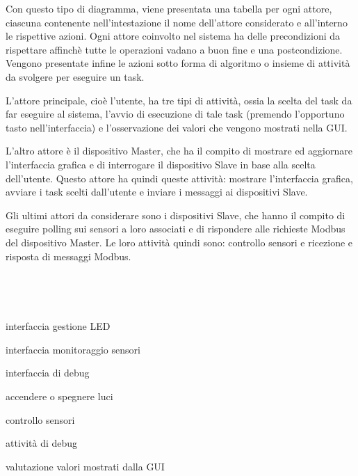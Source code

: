 \documentclass[a4paper,titlepage]{book}
\begin{document}
Con questo tipo di diagramma, viene presentata una tabella per ogni attore, ciascuna contenente nell'intestazione il nome dell'attore considerato e all'interno le rispettive azioni. Ogni attore coinvolto nel sistema ha delle precondizioni da rispettare affinchè tutte le operazioni vadano a buon fine e una postcondizione. Vengono presentate infine le azioni sotto forma di algoritmo o insieme di attività da svolgere per eseguire un task.

L'attore principale, cioè l'utente, ha tre tipi di attività, ossia la scelta del task da far eseguire al sistema, l'avvio di esecuzione di tale task (premendo l'opportuno tasto nell'interfaccia) e l'osservazione dei valori che vengono mostrati nella GUI.

L'altro attore è il dispositivo Master, che ha il compito di mostrare ed aggiornare l'interfaccia grafica e di interrogare il dispositivo Slave in base alla scelta dell'utente. Questo attore ha quindi queste attività: mostrare l'interfaccia grafica, avviare i task scelti dall'utente e inviare i messaggi ai dispositivi Slave.

Gli ultimi attori da considerare sono i dispositivi Slave, che hanno il compito di eseguire polling sui sensori a loro associati e di rispondere alle richieste Modbus del dispositivo Master. Le loro attività quindi sono: controllo sensori e ricezione e risposta di messaggi Modbus.

~

~

\begin{usecase}
  	{\item interfaccia gestione LED
                             	\item interfaccia monitoraggio sensori
				\item interfaccia di debug}

  	{\item accendere o spegnere luci
                             	\item controllo sensori
				\item attività di debug}

  	{\item valutazione valori mostrati dalla GUI}

\end{usecase}
\end{document}

